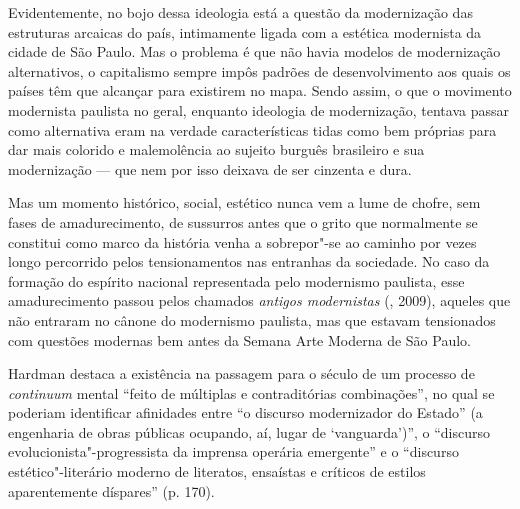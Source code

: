 Evidentemente, no bojo dessa ideologia está a questão da modernização
das estruturas arcaicas do país, intimamente ligada com a estética
modernista da cidade de São Paulo. Mas o problema é que não havia
modelos de modernização alternativos, o capitalismo sempre impôs padrões
de desenvolvimento aos quais os países têm que alcançar para existirem
no mapa. Sendo assim, o que o movimento modernista paulista no geral,
enquanto ideologia de modernização, tentava passar como alternativa eram
na verdade características tidas como bem próprias para dar mais
colorido e malemolência ao sujeito burguês brasileiro e sua modernização
--- que nem por isso deixava de ser cinzenta e dura.

Mas um momento histórico, social, estético nunca vem a lume de chofre,
sem fases de amadurecimento, de sussurros antes que o grito que
normalmente se constitui como marco da história venha a sobrepor"-se ao
caminho por vezes longo percorrido pelos tensionamentos nas entranhas da
sociedade. No caso da formação do espírito nacional representada pelo
modernismo paulista, esse amadurecimento passou pelos chamados
\emph{antigos modernistas} (, 2009), aqueles que não entraram no
cânone do modernismo paulista, mas que estavam tensionados com questões
modernas bem antes da Semana Arte Moderna de São Paulo.

Hardman destaca a existência na passagem para o século  de um processo
de \emph{continuum} mental ``feito de múltiplas e contraditórias
combinações'', no qual se poderiam identificar afinidades entre ``o
discurso modernizador do Estado'' (a engenharia de obras públicas
ocupando, aí, lugar de `vanguarda')'', o ``discurso
evolucionista"-progressista da imprensa operária emergente'' e o
``discurso estético"-literário moderno de literatos, ensaístas e críticos
de estilos aparentemente díspares'' (p. 170).


